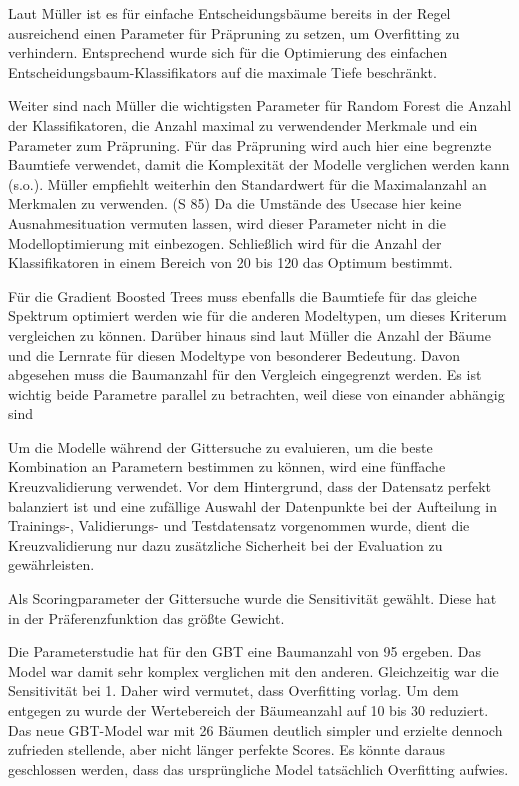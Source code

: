 Laut Müller  ist es für einfache Entscheidungsbäume bereits in der Regel ausreichend einen Parameter für Präpruning zu setzen, um Overfitting zu verhindern. Entsprechend wurde sich für die Optimierung des einfachen Entscheidungsbaum-Klassifikators auf die maximale Tiefe beschränkt. 

Weiter sind nach Müller die wichtigsten Parameter für Random Forest die Anzahl der Klassifikatoren, die Anzahl maximal zu verwendender Merkmale und ein Parameter zum Präpruning. Für das Präpruning wird auch hier eine begrenzte Baumtiefe verwendet, damit die Komplexität der Modelle verglichen werden kann (s.o.). 
Müller empfiehlt weiterhin den Standardwert für die Maximalanzahl an Merkmalen zu verwenden. (S 85) Da die Umstände des Usecase hier keine Ausnahmesituation vermuten lassen, wird dieser Parameter nicht in die Modelloptimierung mit einbezogen.
Schließlich wird für die Anzahl der Klassifikatoren in einem Bereich von 20 bis 120 das Optimum bestimmt.

Für die Gradient Boosted Trees muss ebenfalls die Baumtiefe für das gleiche Spektrum optimiert werden wie für die anderen Modeltypen, um dieses Kriterum vergleichen zu können. Darüber hinaus sind laut Müller  die Anzahl der Bäume und die Lernrate für diesen Modeltype von besonderer Bedeutung. Davon abgesehen muss die Baumanzahl für den Vergleich eingegrenzt werden. Es ist wichtig beide Parametre parallel zu betrachten, weil diese von einander abhängig sind 

Um die Modelle während der Gittersuche zu evaluieren, um die beste Kombination an Parametern bestimmen zu können, wird eine fünffache Kreuzvalidierung verwendet. Vor dem Hintergrund, dass der Datensatz perfekt balanziert ist und eine zufällige Auswahl der Datenpunkte bei der Aufteilung in Trainings-, Validierungs- und Testdatensatz vorgenommen wurde, dient die Kreuzvalidierung nur dazu zusätzliche Sicherheit bei der Evaluation zu gewährleisten.

Als Scoringparameter der Gittersuche wurde die Sensitivität gewählt. Diese hat in der Präferenzfunktion das größte Gewicht. 

Die Parameterstudie hat für den GBT eine Baumanzahl von 95 ergeben. Das Model war damit sehr komplex verglichen mit den anderen. Gleichzeitig war die Sensitivität bei 1. Daher wird vermutet, dass Overfitting vorlag. Um dem entgegen zu wurde der Wertebereich der Bäumeanzahl auf 10 bis 30 reduziert. Das neue GBT-Model war mit 26 Bäumen deutlich simpler und erzielte dennoch zufrieden stellende, aber nicht länger perfekte Scores. Es könnte daraus geschlossen werden, dass das ursprüngliche Model tatsächlich Overfitting aufwies.